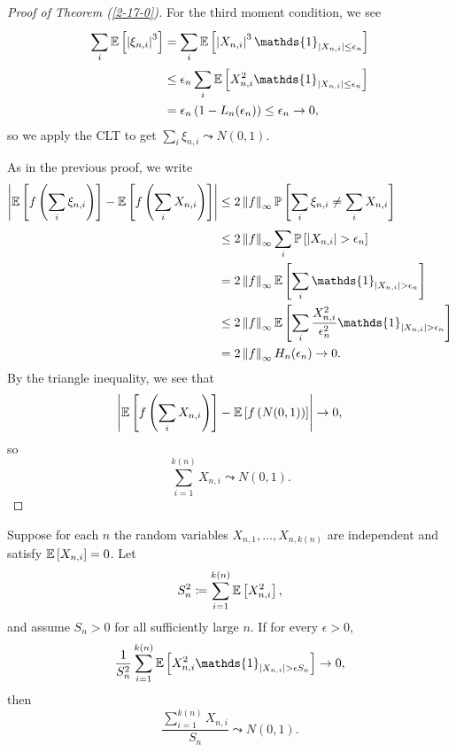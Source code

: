 \begin{proof}[Proof of Theorem (\ref{2-17-0})]
	For the third moment condition, we see
	\begin{align*}
		\sum\limits_{i}^{} \E\left[\left| \xi_{n,i} \right|^3\right] 
		&= \sum\limits_{i}^{} \E\left[\left| X_{n,i} \right|^3 \mathds{1}_{\left| X_{n,i} \right|\le \epsilon_n}\right]  \\
		&\le \epsilon_n \sum\limits_{i}^{} \E\left[X_{n,i}^2 \mathds{1}_{\left| X_{n,i} \right|\le \epsilon_n}\right] \\
		&= \epsilon_n \left(1 - L_n(\epsilon_n)\right) \le \epsilon_n \to 0
	,\end{align*}
	so we apply the CLT to get $\sum\limits_{i}^{} \xi_{n,i} \leadsto N(0,1)$.

	As in the previous proof, we write
	\begin{align*}
		\left| \E\left[f\left( \sum\limits_{i}^{} \xi_{n,i} \right)\right] - \E\left[f\left( \sum_i X_{n,i} \right)\right]  \right|
		&\le 2 \left\|f\right\|_{\infty} \P\left[\sum\limits_{i}^{} \xi_{n,i}\ne \sum\limits_{i}^{} X_{n,i}\right] \\
		&\le 2 \left\|f\right\|_{\infty} \sum\limits_{i}^{} \P\left[\left| X_{n,i} \right| > \epsilon_n\right] \\
		&= 2 \left\|f\right\|_{\infty} \E\left[\sum\limits_{i}^{} \mathds{1}_{\left| X_{n,i} \right| > \epsilon_n}\right] \\
		&\le 2\left\|f\right\|_{\infty} \E\left[\sum\limits_{i}^{} \frac{X_{n,i}^2}{\epsilon_n^2} \mathds{1}_{\left| X_{n,i} \right| > \epsilon_n}\right] \\
		&= 2 \left\|f\right\|_{\infty}H_n(\epsilon_n) \to 0
	.\end{align*}
	By the triangle inequality, we see that \[
		\left|\mathbb{E}\left[f\left( \sum\limits_{i} X_{n,i} \right)\right] - \mathbb{E}\left[f\left( N(0,1) \right)\right] \right| \to 0
	,\] 
	so \[
		\sum\limits_{i=1}^{k(n)} X_{n,i} \leadsto N(0,1)
	.\] 
\end{proof}

\begin{theorem} \label{2-17-3}
	Suppose	for each $n$ the random variables $X_{n,1},\ldots,X_{n,k(n)}$ are independent and satisfy $\mathbb{E}\left[X_{n,i}\right] = 0$.
	Let
	\[
		S_n^2 \coloneqq \sum\limits_{i=1}^{k(n)} \mathbb{E}\left[X_{n,i}^2\right],
	\]
	and assume $S_n > 0$ for all sufficiently large $n$. If for every $\epsilon > 0$,
	\[
		\frac{1}{S_n^2} \sum\limits_{i=1}^{k(n)} \E\left[ X_{n,i}^2 \mathds{1}_{\left| X_{n,i} \right| > \epsilon S_n} \right] \to 0,
	\]
	then
	\[
		\frac{\sum\limits_{i=1}^{k(n)} X_{n,i}}{S_n} \leadsto N(0,1)
	.\]
\end{theorem}

